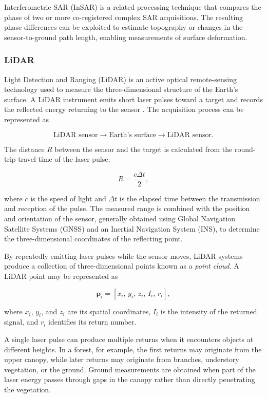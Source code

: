 \documentclass[11pt,a4paper]{article}
\begin{document}
Interferometric SAR (InSAR) is a related processing technique that
compares the phase of two or more co-registered complex SAR acquisitions.
The resulting phase differences can be exploited to estimate topography
or changes in the sensor-to-ground path length, enabling measurements of
surface deformation.

\subsubsection{LiDAR}

Light Detection and Ranging (LiDAR) is an active optical remote-sensing
technology used to measure the three-dimensional structure of the
Earth's surface. A LiDAR instrument emits short laser pulses toward a
target and records the reflected energy returning to the sensor
\cite{baltsavias1999airborne}. The acquisition process can be represented
as

\[
\text{LiDAR sensor}
\longrightarrow
\text{Earth's surface}
\longrightarrow
\text{LiDAR sensor}.
\]

The distance \(R\) between the sensor and the target is calculated from
the round-trip travel time of the laser pulse:

\[
R = \frac{c\Delta t}{2},
\]

where \(c\) is the speed of light and \(\Delta t\) is the elapsed time
between the transmission and reception of the pulse. The measured range
is combined with the position and orientation of the sensor, generally
obtained using Global Navigation Satellite Systems (GNSS) and an
Inertial Navigation System (INS), to determine the three-dimensional
coordinates of the reflecting point.

By repeatedly emitting laser pulses while the sensor moves, LiDAR
systems produce a collection of three-dimensional points known as a
\textit{point cloud}. A LiDAR point may be represented as

\[
\mathbf{p}_i =
\left[
x_i,\,
y_i,\,
z_i,\,
I_i,\,
r_i
\right],
\]

where \(x_i\), \(y_i\), and \(z_i\) are its spatial coordinates,
\(I_i\) is the intensity of the returned signal, and \(r_i\) identifies
its return number.

A single laser pulse can produce multiple returns when it encounters
objects at different heights. In a forest, for example, the first
returns may originate from the upper canopy, while later returns may
originate from branches, understory vegetation, or the ground. Ground
measurements are obtained when part of the laser energy passes through
gaps in the canopy rather than directly penetrating the vegetation.
\end{document}
